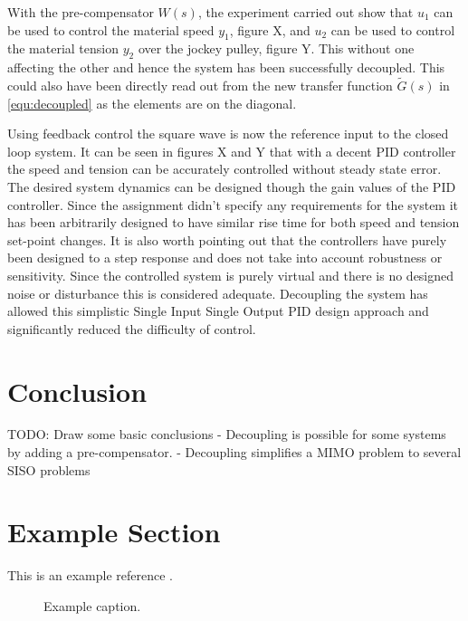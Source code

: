 \documentclass[a4paper, titlepage]{article}
\begin{document}
With the pre-compensator $W(s)$, the experiment carried out show that $u_1$ can be used to control the material speed $y_1$, figure X, and $u_2$ can be used to control the material tension $y_2$ over the jockey pulley, figure Y.
This without one affecting the other and hence the system has been successfully decoupled.
This could also have been directly read out from the new transfer function $\tilde{G}(s)$ in \ref{equ:decoupled} as the elements are on the diagonal.

Using feedback control the square wave is now the reference input to the closed loop system.
It can be seen in figures X and Y that with a decent PID controller the speed and tension can be accurately controlled without steady state error.
The desired system dynamics can be designed though the gain values of the PID controller.
Since the assignment didn't specify any requirements for the system it has been arbitrarily designed to have similar rise time for both speed and tension set-point changes.
It is also worth pointing out that the controllers have purely been designed to a step response and does not take into account robustness or sensitivity.
Since the controlled system is purely virtual and there is no designed noise or disturbance this is considered adequate.
Decoupling the system has allowed this simplistic Single Input Single Output PID design approach and significantly reduced the difficulty of control.

\section{Conclusion}
TODO: Draw some basic conclusions
- Decoupling is possible for some systems by adding a pre-compensator.
- Decoupling simplifies a MIMO problem to several SISO problems



\clearpage


\clearpage
\appendix

\section{Example Section}
This is an example reference \citep{glad00}.

\begin{figure}[h!]
\center
\caption{Example caption.}
\label{fig:exampleLable}
\end{figure}


\end{document}

